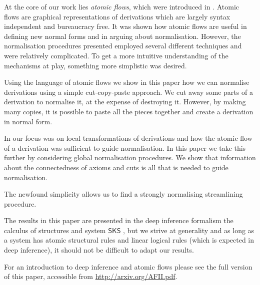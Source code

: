\documentclass[a4paper]{llncs}
\begin{document}
At the core of our work lies \emph{atomic flows}, which were introduced in \cite{GuglGund:07:Normalis:lr}. Atomic flows are graphical representations of derivations which are largely syntax independent and bureaucracy free. It was shown how atomic flows are useful in defining new normal forms and in arguing about normalisation. However, the normalisation procedures presented employed several different techniques and were relatively complicated. To get a more intuitive understanding of the mechanisms at play, something more simplistic was desired.

Using the language of atomic flows we show in this paper how we can normalise derivations using a simple cut-copy-paste approach. We cut away some parts of a derivation to normalise it, at the expense of destroying it. However, by making many copies, it is possible to paste all the pieces together and create a derivation in normal form.

In \cite{GuglGund:07:Normalis:lr} our focus was on local transformations of derivations and how the atomic flow of a derivation was sufficient to guide normalisation. In this paper we take this further by considering global normalisation procedures. We show that information about the connectedness of axioms and cuts is all that is needed to guide normalisation.

The newfound simplicity allows us to find a strongly normalising streamlining procedure.

\newcommand{\SKS}{\mathsf{SKS}}
The results in this paper are presented in the deep inference formalism the calculus of structures \cite{Gugl:06:A-System:kl} and system $\SKS$ \cite{BrunTiu:01:A-Local-:mz}, but we strive at generality and as long as a system has atomic structural rules and linear logical rules (which is expected in deep inference), it should not be difficult to adapt our results.

For an introduction to deep inference and atomic flows please see the full version of this paper, accessible from \url{http://arxiv.org/AFII.pdf}.
\end{document}
